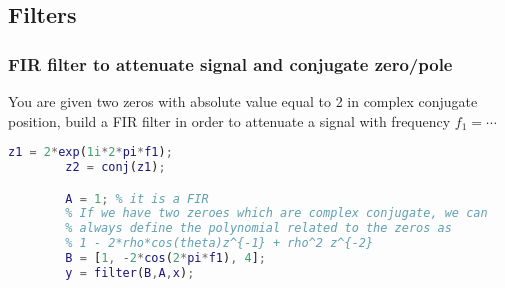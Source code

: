 \pagebreak\subsection{Filters}

    \subsubsection{FIR filter to attenuate signal and conjugate zero/pole}
    You are given two zeros with absolute value equal to 2 in complex conjugate position, build a FIR filter in order to attenuate a signal with frequency $f_1=\cdots$
    \begin{lstlisting}[language=Matlab, escapeinside=`']
        z1 = 2*exp(1i*2*pi*f1);
        z2 = conj(z1);

        A = 1; % it is a FIR
        % If we have two zeroes which are complex conjugate, we can
        % always define the polynomial related to the zeros as
        % 1 - 2*rho*cos(theta)z^{-1} + rho^2 z^{-2}
        B = [1, -2*cos(2*pi*f1), 4];
        y = filter(B,A,x);
    \end{lstlisting}    

